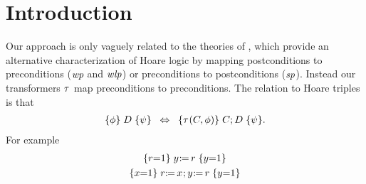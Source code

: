 \section{Introduction}

Our approach is only vaguely related to the theories of
\citet{DBLP:journals/cacm/Dijkstra75}, which provide an alternative
characterization of Hoare logic by mapping postconditions to preconditions
($\textit{wp}$ and $\textit{wlp}$) or preconditions to postconditions ($\textit{sp}$).  Instead
our transformers $\tau^{}$ map preconditions to preconditions. The relation to
Hoare triples is that
\begin{align*}
  \{\phi\}\allowbreak\;D\;\allowbreak\{\psi\}
  \;\;\Leftrightarrow\;\;
  \{\tau^{}(C,\phi)\}\allowbreak\;C\mathtt{;}\,\allowbreak D\;\allowbreak\{\psi\}
  .
\end{align*}
For example
\begin{gather*}
  \hoare{r{=}1}{\PW{y}{r}}{y{=}1}
  \\
  \hoare{x{=}1}{\PR{x}{r}\SEMI\PW{y}{r}}{y{=}1}
\end{gather*}


\endinput

This paper builds on
\cite{2019-sp} and
\cite{10.1145/3428262}.


Pomsets are a nice model of concurrent computation.
Predicate transformers are a nice model of sequential computation.
We show how these interact.

We do this by attaching predicate transformers to \emph{configurations}.

Thus the amount of transformation depends on which read events are seen in
the configuration.

We develop the theory of pomsets with predicate transformers, then apply the
theory to model relaxed memory.

Other things we could model include Map/Reduce and Fork/Join.
